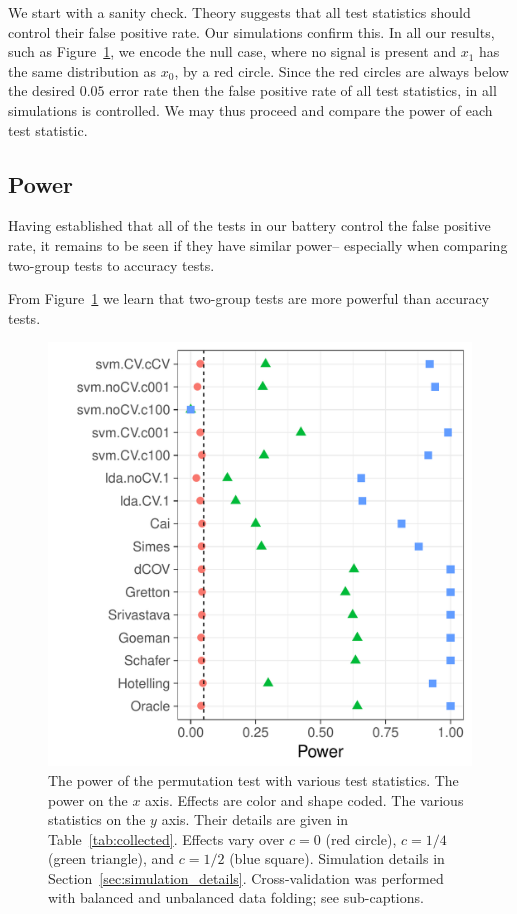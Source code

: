 \documentclass[journal]{IEEEtran}
\begin{document}
We start with a sanity check. 
Theory suggests that all test statistics should control their false positive rate. 
Our simulations confirm this.
In all our results, such as Figure~\ref{fig:simulation_1}, we encode the null case, where no signal is present and $x_1$ has the same distribution as $x_0$, by a red circle. 
Since the red circles are always below the desired $0.05$ error rate then the false positive rate of all test statistics, in all simulations is controlled. 
We may thus proceed and compare the power of each test statistic. 






\subsection{Power}
\label{sec:power}

Having established that all of the tests in our battery control the false positive rate, it remains to be seen if they have similar power-- especially when comparing two-group tests to accuracy tests. 

From Figure~\ref{fig:simulation_1} we learn that two-group tests are more powerful than accuracy tests.

\begin{figure}[h]
	\centering
	\includegraphics[width=0.9\columnwidth]{"art/file2"}
	\caption{
		The power of the permutation test with various test statistics. 
		The power on the $x$ axis. 
		Effects are color and shape coded. 
		The various statistics on the $y$ axis. 
		Their details are given in Table~\ref{tab:collected}. 
		Effects vary over $c=0$ (red circle), $c=1/4$ (green triangle), and $c=1/2$ (blue square). 
		Simulation details in Section~\ref{sec:simulation_details}.
		Cross-validation was performed with balanced and unbalanced data folding; see sub-captions.}	
	\label{fig:simulation_1}
\end{figure}
\end{document}
